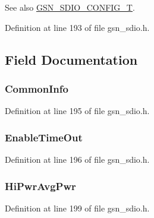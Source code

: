 \begin{DoxySeeAlso}{See also}
\hyperlink{a00653_ga741fda4dc2cd93143a8a73ddaace7de8}{GSN\_\-SDIO\_\-CONFIG\_\-T}. 
\end{DoxySeeAlso}


Definition at line 193 of file gsn\_\-sdio.h.



\subsection{Field Documentation}
\hypertarget{a00220_add1e98df141f0aecee01016e6471983b}{
\subsubsection[{CommonInfo}]{ {\bf CommonInfo}}}
\label{a00220_add1e98df141f0aecee01016e6471983b}


Definition at line 195 of file gsn\_\-sdio.h.

\hypertarget{a00220_aff67221faaecbc9832dd160acf8e188e}{
\subsubsection[{EnableTimeOut}]{ {\bf EnableTimeOut}}}
\label{a00220_aff67221faaecbc9832dd160acf8e188e}


Definition at line 196 of file gsn\_\-sdio.h.

\hypertarget{a00220_a7e3e11d35a811be9b7a61f99e22bed1c}{
\subsubsection[{HiPwrAvgPwr}]{ {\bf HiPwrAvgPwr}}}
\label{a00220_a7e3e11d35a811be9b7a61f99e22bed1c}


Definition at line 199 of file gsn\_\-sdio.h.

